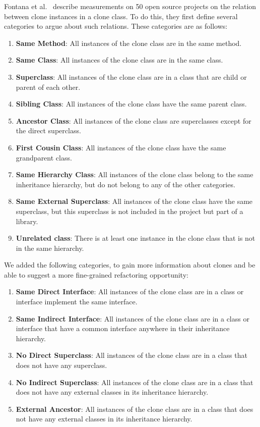 \documentclass[runningheads]{llncs}
\begin{document}
Fontana et al.~\cite{fontana2015duplicated} describe measurements on 50 open source projects on the relation between clone instances in a clone class. To do this, they first define several categories to argue about such relations. These categories are as follows:
\begin{enumerate}
  \item \textbf{Same Method}: All instances of the clone class are in the same method.
  \item \textbf{Same Class}: All instances of the clone class are in the same class.
  \item \textbf{Superclass}: All instances of the clone class are in a class that are child or parent of each other.
  \item \textbf{Sibling Class}: All instances of the clone class have the same parent class.
    \item \textbf{Ancestor Class}: All instances of the clone class are superclasses except for the direct superclass.
  \item \textbf{First Cousin Class}: All instances of the clone class have the same grandparent class.
\item \textbf{Same Hierarchy Class}: All instances of the clone class belong to the same inheritance hierarchy, but do not belong to any of the other categories.
\item \textbf{Same External Superclass}: All instances of the clone class have the same superclass, but this superclass is not included in the project but part of a library.
\item \textbf{Unrelated class}: There is at least one instance in the clone class that is not in the same hierarchy.
\end{enumerate}

We added the following categories, to gain more information about clones and be able to suggest a more fine-grained refactoring opportunity:

\begin{enumerate}
\item \textbf{Same Direct Interface}: All instances of the clone class are in a class or interface implement the same interface.
\item \textbf{Same Indirect Interface}: All instances of the clone class are in a class or interface that have a common interface anywhere in their inheritance hierarchy.
\item \textbf{No Direct Superclass}: All instances of the clone class are in a class that does not have any superclass.
\item \textbf{No Indirect Superclass}: All instances of the clone class are in a class that does not have any external classes in its inheritance hierarchy.
\item \textbf{External Ancestor}: All instances of the clone class are in a class that does not have any external classes in its inheritance hierarchy.
\end{enumerate}
\end{document}

